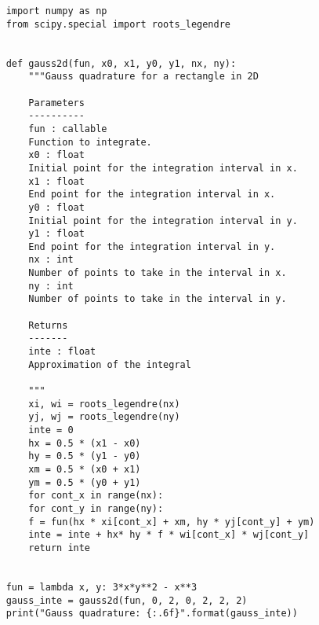 \begin{verbatim}
    import numpy as np
    from scipy.special import roots_legendre


    def gauss2d(fun, x0, x1, y0, y1, nx, ny):
        """Gauss quadrature for a rectangle in 2D
        
        Parameters
        ----------
        fun : callable
        Function to integrate.
        x0 : float
        Initial point for the integration interval in x.
        x1 : float
        End point for the integration interval in x.
        y0 : float
        Initial point for the integration interval in y.
        y1 : float
        End point for the integration interval in y.
        nx : int
        Number of points to take in the interval in x.
        ny : int
        Number of points to take in the interval in y.
        
        Returns
        -------
        inte : float
        Approximation of the integral
        
        """
        xi, wi = roots_legendre(nx)
        yj, wj = roots_legendre(ny)
        inte = 0
        hx = 0.5 * (x1 - x0)
        hy = 0.5 * (y1 - y0)
        xm = 0.5 * (x0 + x1)
        ym = 0.5 * (y0 + y1)
        for cont_x in range(nx):
        for cont_y in range(ny):
        f = fun(hx * xi[cont_x] + xm, hy * yj[cont_y] + ym)
        inte = inte + hx* hy * f * wi[cont_x] * wj[cont_y]
        return inte


    fun = lambda x, y: 3*x*y**2 - x**3
    gauss_inte = gauss2d(fun, 0, 2, 0, 2, 2, 2)
    print("Gauss quadrature: {:.6f}".format(gauss_inte))
\end{verbatim}

